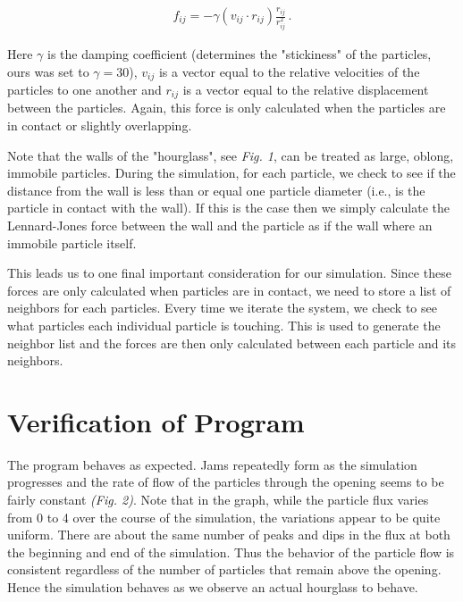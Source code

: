 \documentclass{article}%
\newcommand{\tab} {\hspace{5mm}}
\begin{document}
 
\begin{align}
	f_{ij} = -\gamma(v_{ij}\cdot r_{ij})\frac{r_{ij}}{r_{ij}^2}\,.
\end{align}

Here $\gamma$ is the damping coefficient (determines the "stickiness" of the particles, ours was set to $\gamma = 30$), $v_{ij}$ is a vector equal to the relative velocities of the particles to one another and $r_{ij}$ is a vector equal to the relative displacement between the particles. Again, this force is only calculated when the particles are in contact or slightly overlapping.

	Note that the walls of the "hourglass", see \textit{Fig. 1}, can be treated as large, oblong, immobile particles. During the simulation, for each particle, we check to see if the distance from the wall is less than or equal one particle diameter (i.e., is the particle in contact with the wall). If this is the case then we simply calculate the Lennard-Jones force between the wall and the particle as if the wall where an immobile particle itself.

	This leads us to one final important consideration for our simulation. Since these forces are only calculated when particles are in contact, we need to store a list of neighbors for each particles. Every time we iterate the system, we check to see what particles each individual particle is touching. This is used to generate the neighbor list and the forces are then only calculated between each particle and its neighbors.





\section{Verification of Program}

\tab The program behaves as expected. Jams repeatedly form as the simulation progresses and the rate of flow of the particles through the opening seems to be fairly constant \textit{(Fig. 2)}. Note that in the graph, while the particle flux varies from 0 to 4 over the course of the simulation, the variations appear to be quite uniform. There are about the same number of peaks and dips in the flux at both the beginning and end of the simulation. Thus the behavior of the particle flow is consistent regardless of the number of particles that remain above the opening. Hence the simulation behaves as we observe an actual hourglass to behave.
\end{document}
